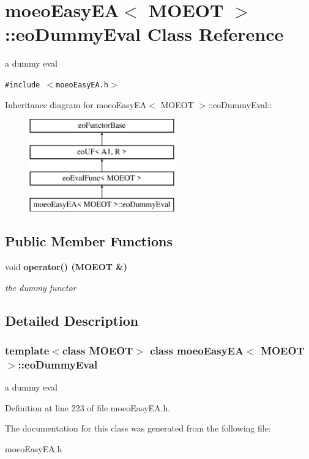 \section{moeo\-Easy\-EA$<$ MOEOT $>$::eo\-Dummy\-Eval Class Reference}
\label{classmoeoEasyEA_1_1eoDummyEval}
a dummy eval  


{\tt \#include $<$moeo\-Easy\-EA.h$>$}

Inheritance diagram for moeo\-Easy\-EA$<$ MOEOT $>$::eo\-Dummy\-Eval::\begin{figure}[H]
\begin{center}
\leavevmode
\includegraphics[height=4cm]{classmoeoEasyEA_1_1eoDummyEval}
\end{center}
\end{figure}
\subsection*{Public Member Functions}
\begin{CompactItemize}
\item 
void \bf{operator()} (MOEOT \&)\label{classmoeoEasyEA_1_1eoDummyEval_1ed55869451f883db2fc43c60f7caff5}

\begin{CompactList}\small\item\em the dummy functor \item\end{CompactList}\end{CompactItemize}


\subsection{Detailed Description}
\subsubsection*{template$<$class MOEOT$>$ class moeo\-Easy\-EA$<$ MOEOT $>$::eo\-Dummy\-Eval}

a dummy eval 



Definition at line 223 of file moeo\-Easy\-EA.h.

The documentation for this class was generated from the following file:\begin{CompactItemize}
\item 
moeo\-Easy\-EA.h\end{CompactItemize}
